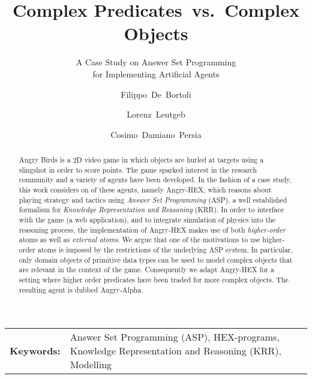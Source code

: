 \documentclass{llncs}
\title{Complex Predicates~vs.~Complex Objects}
\subtitle{A Case Study on Answer Set Programming\\ for Implementing Artificial Agents}
\author{Filippo~De~Bortoli \and Lorenz~Leutgeb \and Cosimo~Damiano~Persia}
\institute{International Center for Computational Logic, TU Dresden\\ \email{\{filippo.de\_bortoli,lorenz.leutgeb,cosimo\_damiano.persia\}@mailbox.tu-dresden.de}}
\newcommand{\ah}{Angry-HEX\xspace}
\begin{document}
\maketitle

\begin{abstract}
Angry Birds is a 2D video game in which objects are hurled at targets using a slingshot in order to score points. The game sparked interest in the research community and a variety of agents have been developed.
In the fashion of a case study, this work considers on of these agents, namely \ah, which reasons about playing strategy and tactics using \emph{Answer Set Programming} (ASP), a well established formalism for \emph{Knowledge Representation and Reasoning} (KRR).
In order to interface with the game (a web application), and to integrate simulation of physics into the reasoning process, the implementation of \ah makes use of both \emph{higher-order} atoms as well as \emph{external atoms}.
We argue that one of the motivations to use higher-order atoms is imposed by the restrictions of the underlying ASP system. In particular, only domain objects of primitive data types can be used to model complex objects that are relevant in the context of the game.
Consequently we adapt \ah for a setting where higher order predicates have been traded for more complex objects. The resulting agent is dubbed Angry-Alpha.
\end{abstract}

\begin{center}
\begin{tabular}{p{}p{}}
\bfseries{Keywords:} & Answer Set Programming (ASP), HEX-programs, Knowledge Representation and Reasoning (KRR), Modelling\\
\end{tabular}
\end{center}








\end{document}
